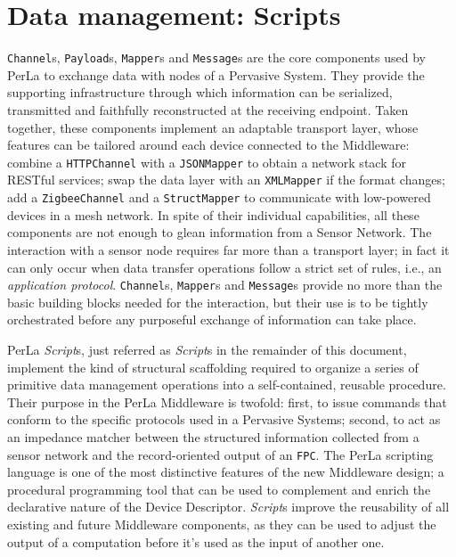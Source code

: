 \section{Data management: Scripts}
\label{sec:components.script}

\texttt{Channel}s, \texttt{Payload}s, \texttt{Mapper}s and \texttt{Message}s
are the core components used by PerLa to exchange data with nodes of a
Pervasive System. They provide the supporting infrastructure through which
information can be serialized, transmitted and faithfully reconstructed at the
receiving endpoint. Taken together, these components implement an adaptable
transport layer, whose features can be tailored around each device connected to
the Middleware: combine a \texttt{HTTPChannel} with a \texttt{JSONMapper} to
obtain a network stack for RESTful services; swap the data layer with an
\texttt{XMLMapper} if the format changes; add a \texttt{ZigbeeChannel} and a
\texttt{StructMapper} to communicate with low-powered devices in a mesh
network. In spite of their individual capabilities, all these components are
not enough to glean information from a Sensor Network. The interaction with a
sensor node requires far more than a transport layer; in fact it can only occur
when data transfer operations follow a strict set of rules, i.e., an
\textit{application protocol}. \texttt{Channel}s, \texttt{Mapper}s and
\texttt{Message}s provide no more than the basic building blocks needed for the
interaction, but their use is to be tightly orchestrated before any purposeful
exchange of information can take place.

PerLa \textit{Script}s, just referred as \textit{Script}s in the remainder of
this document, implement the kind of structural scaffolding required to
organize a series of primitive data management operations into a
self-contained, reusable procedure. Their purpose in the PerLa Middleware is
twofold: first, to issue commands that conform to the specific protocols used
in a Pervasive Systems; second, to act as an impedance matcher between the
structured information collected from a sensor network and the record-oriented
output of an \texttt{FPC}. The PerLa scripting language is one of the most
distinctive features of the new Middleware design; a procedural programming
tool that can be used to complement and enrich the declarative nature of the
Device Descriptor. \textit{Script}s improve the reusability of all existing and
future Middleware components, as they can be used to adjust the output of a
computation before it's used as the input of another one.

